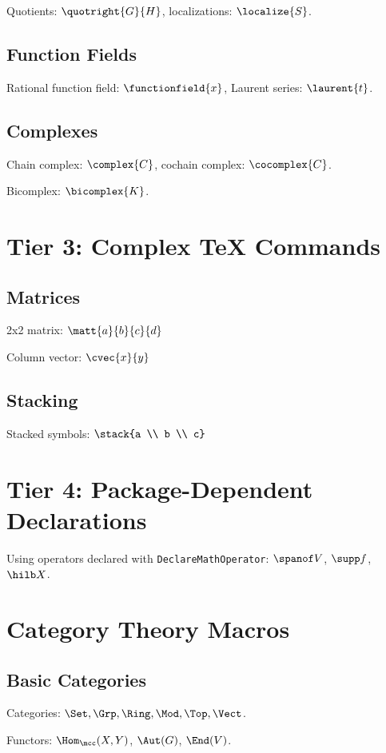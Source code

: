 \documentclass[11pt]{scrartcl}
\begin{document}
Quotients: $\quotright{G}{H}$, localizations: $\localize{S}$.

\subsection{Function Fields}
Rational function field: $\functionfield{x}$, Laurent series: $\laurent{t}$.

\subsection{Complexes}
Chain complex: $\complex{C}$, cochain complex: $\cocomplex{C}$.

Bicomplex: $\bicomplex{K}$.

\section{Tier 3: Complex TeX Commands}

\subsection{Matrices}
2x2 matrix: $\matt{a}{b}{c}{d}$

Column vector: $\cvec{x}{y}$

\subsection{Stacking}
Stacked symbols: $\stack{a \\ b \\ c}$

\section{Tier 4: Package-Dependent Declarations}

Using operators declared with \texttt{DeclareMathOperator}:
$\spanof V$, $\supp f$, $\hilb X$.

\section{Category Theory Macros}

\subsection{Basic Categories}
Categories: $\Set, \Grp, \Ring, \Mod, \Top, \Vect$.

Functors: $\Hom_{\mcc}(X, Y)$, $\Aut(G)$, $\End(V)$.
\end{document}
